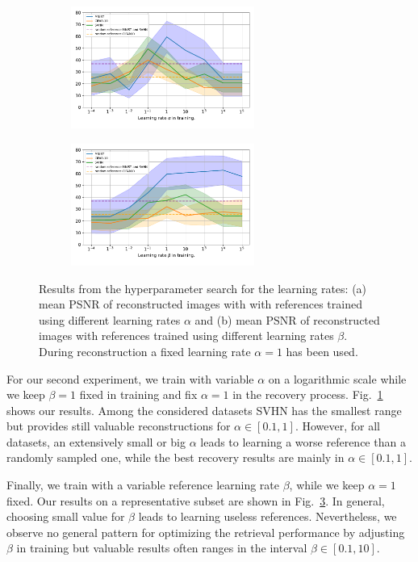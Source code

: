 \begin{figure}
	\begin{subfigure}{.49\textwidth}
		\centering
		\includegraphics[width=6cm, trim= 0 20 0 0]{data/lr-alpha-log-plot-big.pdf}
		\caption{}
		\label{hyperparam-log-a}
	\end{subfigure}
	\begin{subfigure}{.49\textwidth}
		\centering
		\includegraphics[width=6cm, trim= 0 20 0 0]{data/lr-beta-log-plot-big.pdf}
		\caption{}
		\label{hyperparam-log-b}
	\end{subfigure}
	\caption{Results from the hyperparameter search for the learning rates: (a) mean PSNR of reconstructed images with  with references trained using different learning rates $\alpha$ and (b) mean PSNR of reconstructed images with references trained using different learning rates $\beta$. During reconstruction a fixed learning rate $\alpha=1$ has been used.}
\end{figure}

For our second experiment, we train with variable $\alpha$ on a logarithmic scale
while we keep $\beta=1$ fixed in training and fix $\alpha = 1$ in the
recovery process. Fig.~\ref{hyperparam-log-a} shows our results. Among
the considered datasets SVHN has the smallest range but provides still
valuable reconstructions for $\alpha \in [0.1, 1]$. However, for all
datasets, an extensively small or big $\alpha$ leads to learning a worse reference than a randomly sampled one, while the best recovery results are mainly in $\alpha \in [0.1, 1]$.

Finally, we train with a variable reference learning rate $\beta$, while we keep $\alpha=1$ fixed. Our results on a
representative subset are shown in Fig.~\ref{hyperparam-log-b}. In
general, choosing small value for $\beta$ leads to learning useless references. Nevertheless, we observe no general pattern for optimizing the retrieval performance by adjusting $\beta$ in training
but valuable results often ranges in the interval $\beta \in [0.1,10]$.


